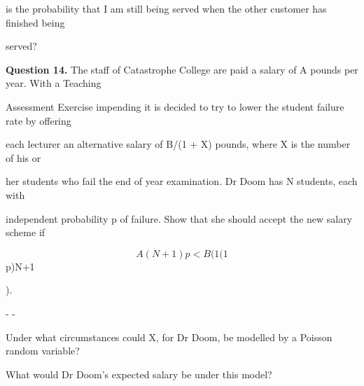 \documentclass[12pt]{article}
\begin{document}
\begin{flushleft}
is the probability that I am still being served when the other customer has finished being\par
served?\par
\bigskip\textbf{Question 14.} The staff of Catastrophe College are paid a salary of A pounds per year. With a Teaching\par
Assessment Exercise impending it is decided to try to lower the student failure rate by offering\par
each lecturer an alternative salary of B/(1 + X) pounds, where X is the number of his or\par
her students who fail the end of year examination. Dr Doom has N students, each with\par
independent probability p of failure. Show that she should accept the new salary scheme if\par
\[A(N + 1)p < B(1 (1\]
p)N+1\par
).\par
- -\par
Under what circumstances could X, for Dr Doom, be modelled by a Poisson random variable?\par
What would Dr Doom's expected salary be under this model?\par
\end{flushleft}
\end{document}
